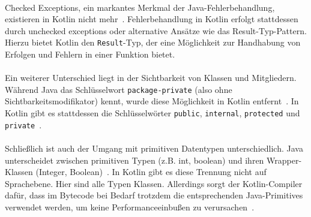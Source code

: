 \documentclass[11pt]{article}
\begin{document}
    \\
    Checked Exceptions, ein markantes Merkmal der Java-Fehlerbehandlung, existieren in Kotlin nicht mehr~\cite{doc-comparison}.
    Fehlerbehandlung in Kotlin erfolgt stattdessen durch unchecked exceptions oder alternative Ansätze wie das Result-Typ-Pattern.
    Hierzu bietet Kotlin den \texttt{Result}-Typ, der eine Möglichkeit zur Handhabung von Erfolgen und Fehlern in einer Funktion bietet.\\
    \\
    Ein weiterer Unterschied liegt in der Sichtbarkeit von Klassen und Mitgliedern.
    Während Java das Schlüsselwort \texttt{package-private} (also ohne Sichtbarkeitsmodifikator) kennt, wurde diese Möglichkeit in Kotlin entfernt~\cite{doc-comparison}.
    In Kotlin gibt es stattdessen die Schlüsselwörter \texttt{public}, \texttt{internal}, \texttt{protected} und \texttt{private}~\cite{kotlin-visibility}.\\
    \\
    Schließlich ist auch der Umgang mit primitiven Datentypen unterschiedlich.
    Java unterscheidet zwischen primitiven Typen (z.B. int, boolean) und ihren Wrapper-Klassen (Integer, Boolean)~\cite{java-autobox}.
    In Kotlin gibt es diese Trennung nicht auf Sprachebene.
    Hier sind alle Typen Klassen.
    Allerdings sorgt der Kotlin-Compiler dafür, dass im Bytecode bei Bedarf trotzdem die entsprechenden Java-Primitives verwendet werden, um keine Performanceeinbußen zu verursachen~\cite{kotlin-types}.
\end{document}
